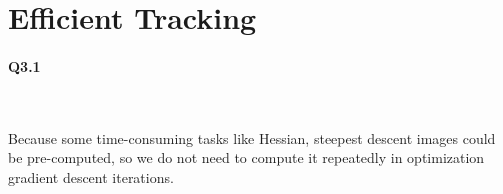 \documentclass[11pt]{article} \usepackage{fullpage} \usepackage{graphicx} \usepackage{epstopdf} \usepackage{color} \usepackage{psfrag} \usepackage{pdfsync}\usepackage{indentfirst}\usepackage{subfigure}\usepackage{float}\usepackage[section]{placeins}
\begin{document}
\section{Efficient Tracking}

\paragraph{Q3.1}~{}

Because some time-consuming tasks like Hessian, steepest descent images could be pre-computed, so we do not need to compute it repeatedly in optimization gradient descent iterations.
\end{document}
